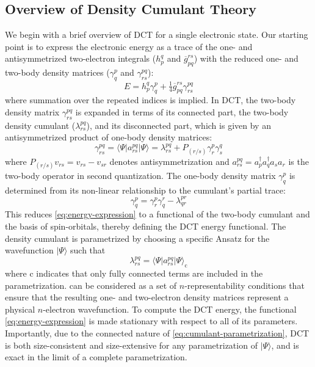 \subsection{Overview of Density Cumulant Theory}
\label{sec:dct}
We begin with a brief overview of DCT for a single electronic state.
Our starting point is to express the electronic energy as a trace of the one-
and antisymmetrized two-electron integrals (\( h_p^q \) and
\(\overline{g}_{pq}^{rs}\)) with the reduced one- and two-body density matrices
(\(\gamma^p_q\) and \(\gamma^{pq}_{rs}\)):
\begin{equation}
    \label{eq:energy-expression}
    E
    =
    h_p^q
    \gamma^p_q
    +
    \tfrac{1}{4}
    \overline{g}_{pq}^{rs}
    \gamma^{pq}_{rs}
\end{equation}
where summation over the repeated indices is implied.
In DCT, the two-body density matrix \(\gamma^{pq}_{rs}\) is expanded in terms of
its connected part, the two-body density cumulant ($\lambda^{pq}_{rs}$), and its
disconnected part, which is given by an antisymmetrized product of one-body
density matrices:\cite{Kutzelnigg:2006p171101}
\begin{equation}
    \label{eq:two-body-n-rep}
    \gamma^{pq}_{rs}
    =
    \langle\Psi|
    a^{pq}_{rs}
    |\Psi\rangle
    =
    \lambda^{pq}_{rs}
    +
    P_{(r/s)}
    \gamma^p_r
    \gamma^q_s
\end{equation}
where \(P_{(r/s)}v_{rs} = v_{rs} - v_{sr}\) denotes antisymmetrization and
\mbox{$a^{pq}_{rs}=a^{\dag}_{p}a^{\dag}_{q}a^{}_{s}a^{}_{r}$} is the two-body operator in second quantization.
The one-body density matrix \(\gamma^p_q\) is determined from its non-linear
relationship to the cumulant's partial trace:\cite{Sokolov:2013p024107}
\begin{equation}
    \label{eq:one-body-n-rep}
    \gamma^p_q
    =
    \gamma^p_r
    \gamma^r_q
    -
    \lambda^{pr}_{qr}
\end{equation}
This reduces \cref{eq:energy-expression} to a functional of the two-body
cumulant and the basis of spin-orbitals, thereby defining the DCT energy
functional.
The density cumulant is parametrized by choosing a specific Ansatz for the
wavefunction \(|\Psi\rangle\) such that\cite{Sokolov:2014p074111}
\begin{equation}
    \label{eq:cumulant-parametrization}
    \lambda^{pq}_{rs}
    =
    \langle\Psi|
    a^{pq}_{rs}
    |\Psi\rangle_\mathrm{c}
\end{equation}
where $\mathrm{c}$ indicates that only fully connected terms are included in the
parametrization.
 can be considered as a set of
\(n\)-representability conditions that ensure that the resulting one- and
two-electron density matrices represent a physical \(n\)-electron wavefunction.
To compute the DCT energy, the functional \eqref{eq:energy-expression} is made
stationary with respect to all of its parameters.
Importantly, due to the connected nature of \cref{eq:cumulant-parametrization},
DCT is both size-consistent and size-extensive for any parametrization of
\(|\Psi\rangle\), and is exact in the limit of a complete
parametrization.\cite{Sokolov:2014p074111}

